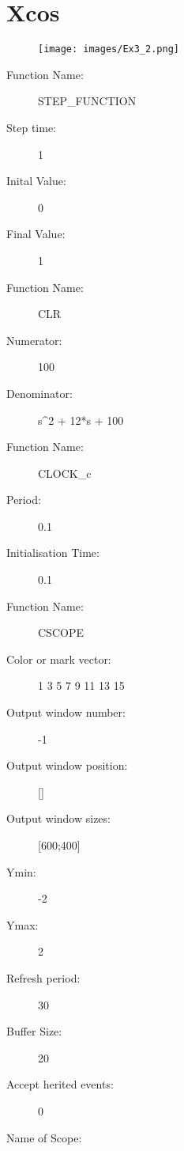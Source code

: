 \documentclass{article}%
\begin{document}
%
\normalsize%
\section{Xcos}%
\label{sec:Xcos}%


\begin{figure}[h!]%
\centering%
\texttt{[image: images/Ex3\_2.png]}%
\end{figure}

%
\begin{description}%
\item[Function Name:]%
STEP\_FUNCTION%
\item[Step time:]%
1%
\item[Inital Value:]%
0%
\item[Final Value:]%
1%
\item[Function Name:]%
CLR%
\item[Numerator:]%
100%
\item[Denominator:]%
s\^{}2 + 12*s + 100%
\item[Function Name:]%
CLOCK\_c%
\item[Period:]%
0.1%
\item[Initialisation Time:]%
0.1%
\item[Function Name:]%
CSCOPE%
\item[Color or mark vector:]%
1 3 5 7 9 11 13 15%
\item[Output window number:]%
{-}1%
\item[Output window position:]%
{[}{]}%
\item[Output window sizes:]%
{[}600;400{]}%
\item[Ymin:]%
{-}2%
\item[Ymax:]%
2%
\item[Refresh period:]%
30%
\item[Buffer Size:]%
20%
\item[Accept herited events:]%
0%
\item[Name of Scope:]%
%
\end{description}

%
\end{document}
